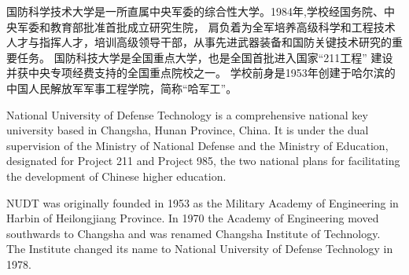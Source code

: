 ﻿\begin{cabstract}
国防科学技术大学是一所直属中央军委的综合性大学。1984年,学校经国务院、中央军委和教育部批准首批成立研究生院，%
肩负着为全军培养高级科学和工程技术人才与指挥人才，培训高级领导干部，从事先进武器装备和国防关键技术研究的重要任务。%
国防科技大学是全国重点大学，也是全国首批进入国家“211工程” 建设并获中央专项经费支持的全国重点院校之一。%
学校前身是1953年创建于哈尔滨的中国人民解放军军事工程学院，简称“哈军工”。
\end{cabstract}

\begin{eabstract}
National University of Defense Technology is a comprehensive national key university based in Changsha, %
Hunan Province, China. It is under the dual supervision of the Ministry of National Defense %
and the Ministry of Education, designated for Project 211 and Project 985, %
the two national plans for facilitating the development of Chinese higher education. %

NUDT was originally founded in 1953 as the Military Academy of Engineering in Harbin of Heilongjiang Province. %
In 1970 the Academy of Engineering moved southwards to Changsha and was renamed Changsha Institute of Technology.%
 The Institute changed its name to National University of Defense Technology in 1978.

\end{eabstract}

